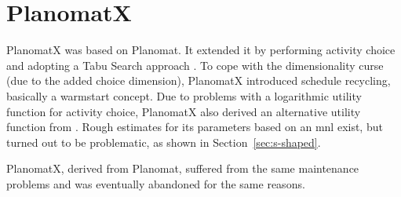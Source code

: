 \section{PlanomatX}
\label{sec:planomatX}
PlanomatX was based on Planomat. It extended it by performing activity choice and adopting a Tabu Search approach \citep[][]{Feil_PhDThesis_2010}. To cope with the dimensionality curse (due to the added choice dimension), PlanomatX introduced schedule recycling, basically a warmstart concept. Due to problems with a logarithmic utility function for activity choice, PlanomatX also derived an alternative utility function from \citet[][]{Joh_PhDThesis_2004}. Rough estimates for its parameters based on an \gls{mnl} exist, but turned out to be problematic, as shown in Section~\ref{sec:s-shaped}.

PlanomatX, derived from Planomat, suffered from the same maintenance problems and was eventually abandoned for the same reasons.







